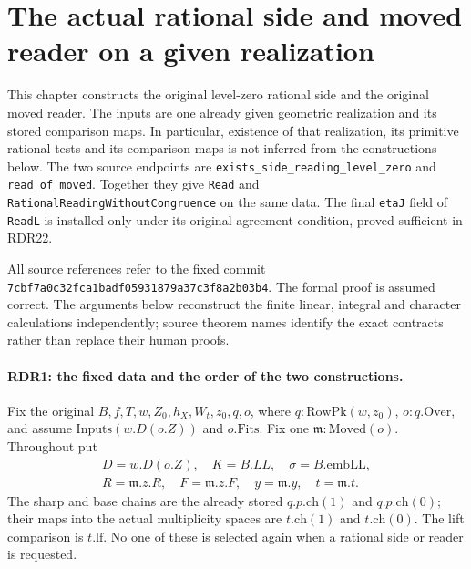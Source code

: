 \section{The actual rational side and moved reader on a given realization}
\label{sec:common-readings-v039}

This chapter constructs the original level-zero rational side and the
original moved reader.  The inputs are one already given geometric
realization and its stored comparison maps.  In particular, existence of
that realization, its primitive rational tests and its comparison maps
is not inferred from the constructions below.  The two source endpoints
are \texttt{exists\_side\_reading\_level\_zero} and
\texttt{read\_of\_moved}.  Together they give \texttt{Read} and
\texttt{RationalReadingWithoutCongruence} on the same data.  The final
\texttt{etaJ} field of \texttt{ReadL} is installed only under its original
agreement condition, proved sufficient in RDR22.

All source references refer to the fixed commit
\texttt{7cbf7a0c32fca1badf05931879a37c3f8a2b03b4}.
The formal proof is assumed correct.  The arguments below reconstruct
the finite linear, integral and character calculations independently;
source theorem names identify the exact contracts rather than replace
their human proofs.

\paragraph{RDR1: the fixed data and the order of the two constructions.}
\label{claim:RDR1}
Fix the original
\(B,f,T,w,Z_0,h_X,W_t,z_0,q,o\), where
\(q:\mathrm{RowPk}(w,z_0)\), \(o:q.\mathrm{Over}\), and assume
\(\mathrm{Inputs}(w.D(o.Z))\) and \(o.\mathrm{Fits}\).
Fix one \(\mathfrak m:\mathrm{Moved}(o)\).  Throughout put
\[
 \begin{gathered}
 D=w.D(o.Z),\quad K=B.LL,\quad \sigma=B.\mathrm{embLL},\\
 R=\mathfrak m.z.R,\quad F=\mathfrak m.z.F,\quad
 y=\mathfrak m.y,\quad t=\mathfrak m.t .
 \end{gathered}                                         \tag{RDR.1}
\]
The sharp and base chains are the already stored \(q.p.\mathrm{ch}(1)\)
and \(q.p.\mathrm{ch}(0)\); their maps into the actual multiplicity
spaces are \(t.\mathrm{ch}(1)\) and \(t.\mathrm{ch}(0)\).
The lift comparison is \(t.\mathrm{lf}\).  No one of these is selected
again when a rational side or reader is requested.

